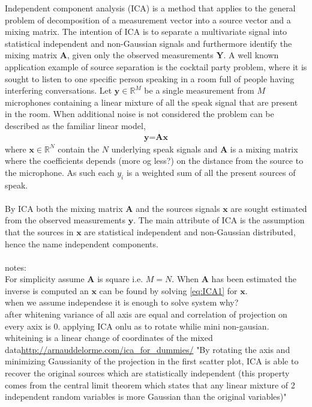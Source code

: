 Independent component analysis (ICA) is a method that applies to  the general problem of decomposition of a measurement vector into a source vector and a mixing matrix. The intention of ICA is to separate a multivariate signal into statistical independent and non-Gaussian signals and furthermore identify the mixing matrix $\textbf{A}$, given only the observed measurements $\textbf{Y}$.
A well known application example of source separation is the cocktail party problem, where it is sought to listen to one specific person speaking in a room full of people having interfering conversations. 
Let $\textbf{y}\in \mathbb{R}^{M}$ be a single measurement from $M$ microphones containing a linear mixture of all the speak signal that are present in the room. When additional noise is not considered the problem can be described as the familiar linear model, 
\begin{align}
\textbf{y}=\textbf{Ax}\label{eq:ICA1}
\end{align}
where $\textbf{x}\in \mathbb{R}^{N}$ contain the $N$ underlying speak signals and $\textbf{A}$ is a mixing matrix where the coefficients depends (more og less?) on the distance from the source to the microphone. As such each $y_i$ is a weighted sum of all the present sources of speak.
\\ \\
By ICA both the mixing matrix $\textbf{A}$ and the sources signals $\textbf{x}$ are sought estimated from the observed measurements $\textbf{y}$. The main attribute of ICA is the assumption that the sources in $\textbf{x}$ are statistical independent and non-Gaussian distributed, hence the name independent components.\\     
\\
notes:\\
For simplicity assume $\textbf{A}$ is square i.e. $M=N$. When $\textbf{A}$ has been estimated the inverse is computed an $\textbf{x}$ can be found by solving \eqref{eq:ICA1} for $\textbf{x}$.\\
when we assume independese it is enough to solve system why?
\\
after whitening variance of all axis are equal and correlation of projection on every axix is 0. applying ICA onlu as to rotate whilie mini non-gausian. whiteining is a linear change of coordinates of the mixed data\url{http://arnauddelorme.com/ica_for_dummies/} "By rotating the axis and minimizing Gaussianity of the projection in the first scatter plot, ICA is able to recover the original sources which are statistically independent (this property comes from the central limit theorem which states that any linear mixture of 2 independent random variables is more Gaussian than the original variables)"\\
